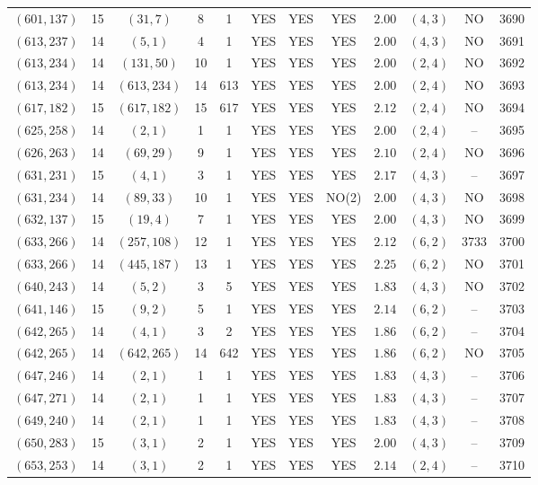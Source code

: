 \begin{longtable}{|c|c|c|c|c|c|c|c|c|c|c|c|}
$(601,137)$ & 15 & $(31,7)$ & 8 & 1 & YES & YES & YES & $2.00$ & $(4,3)$ & NO & 3690\\
$(613,237)$ & 14 & $(5,1)$ & 4 & 1 & YES & YES & YES & $2.00$ & $(4,3)$ & NO & 3691\\
$(613,234)$ & 14 & $(131,50)$ & 10 & 1 & YES & YES & YES & $2.00$ & $(2,4)$ & NO & 3692\\
$(613,234)$ & 14 & $(613,234)$ & 14 & 613 & YES & YES & YES & $2.00$ & $(2,4)$ & NO & 3693\\
$(617,182)$ & 15 & $(617,182)$ & 15 & 617 & YES & YES & YES & $2.12$ & $(2,4)$ & NO & 3694\\
$(625,258)$ & 14 & $(2,1)$ & 1 & 1 & YES & YES & YES & $2.00$ & $(2,4)$ & -- & 3695\\
$(626,263)$ & 14 & $(69,29)$ & 9 & 1 & YES & YES & YES & $2.10$ & $(2,4)$ & NO & 3696\\
$(631,231)$ & 15 & $(4,1)$ & 3 & 1 & YES & YES & YES & $2.17$ & $(4,3)$ & -- & 3697\\
$(631,234)$ & 14 & $(89,33)$ & 10 & 1 & YES & YES & NO(2) & $2.00$ & $(4,3)$ & NO & 3698\\
$(632,137)$ & 15 & $(19,4)$ & 7 & 1 & YES & YES & YES & $2.00$ & $(4,3)$ & NO & 3699\\
$(633,266)$ & 14 & $(257,108)$ & 12 & 1 & YES & YES & YES & $2.12$ & $(6,2)$ & 3733 & 3700\\
$(633,266)$ & 14 & $(445,187)$ & 13 & 1 & YES & YES & YES & $2.25$ & $(6,2)$ & NO & 3701\\
$(640,243)$ & 14 & $(5,2)$ & 3 & 5 & YES & YES & YES & $1.83$ & $(4,3)$ & NO & 3702\\
$(641,146)$ & 15 & $(9,2)$ & 5 & 1 & YES & YES & YES & $2.14$ & $(6,2)$ & -- & 3703\\
$(642,265)$ & 14 & $(4,1)$ & 3 & 2 & YES & YES & YES & $1.86$ & $(6,2)$ & -- & 3704\\
$(642,265)$ & 14 & $(642,265)$ & 14 & 642 & YES & YES & YES & $1.86$ & $(6,2)$ & NO & 3705\\
$(647,246)$ & 14 & $(2,1)$ & 1 & 1 & YES & YES & YES & $1.83$ & $(4,3)$ & -- & 3706\\
$(647,271)$ & 14 & $(2,1)$ & 1 & 1 & YES & YES & YES & $1.83$ & $(4,3)$ & -- & 3707\\
$(649,240)$ & 14 & $(2,1)$ & 1 & 1 & YES & YES & YES & $1.83$ & $(4,3)$ & -- & 3708\\
$(650,283)$ & 15 & $(3,1)$ & 2 & 1 & YES & YES & YES & $2.00$ & $(4,3)$ & -- & 3709\\
$(653,253)$ & 14 & $(3,1)$ & 2 & 1 & YES & YES & YES & $2.14$ & $(2,4)$ & -- & 3710\\

\end{longtable}
